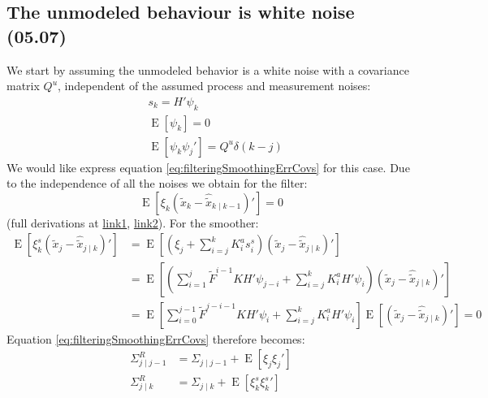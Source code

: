 \documentclass[oneside,12pt]{article}
\begin{document}
\subsection{The unmodeled behaviour is white noise (05.07)}\label{sec:subWhiteNoise}
%
We start by assuming the unmodeled behavior is a white noise with a covariance matrix $Q^u$, independent of the assumed process and measurement noises:
%
\begin{equation}
    \begin{split}
        &s_k = H' \psi_k\\
        &\operatorname{E}[\psi_k] = 0\\
        &\operatorname{E}[\psi_k \psi_j'] = Q^u \delta(k-j)
    \end{split}
\end{equation}
%
We would like express equation \ref{eq:filteringSmoothingErrCovs} for this case. Due to the independence of all the noises we obtain for the filter:
%
\begin{equation}
    \operatorname{E}[\xi_{k}(\tilde{x}_{k}- \hat{\tilde{x}}_{k \mid k-1})'] = 0
\end{equation}
%
(full derivations at \href{https://technionmail-my.sharepoint.com/:b:/g/personal/ron_teichner_campus_technion_ac_il/EfuePiH-kmhMl9R80PHRhnMButsVxmWqnO2MVCnZFKkLaA?e=IvXfRv}{link1}, \href{https://technionmail-my.sharepoint.com/:b:/g/personal/ron_teichner_campus_technion_ac_il/EWJu12JzYTtOq0LrN7YbSkMB4ctEU_lpwbnc20nSpUXWPA?e=ELjyGu}{link2}). For the smoother:
%
\begin{equation}
    \begin{split}
        \operatorname{E}[\xi^s_{k}(\tilde{x}_{j}- \hat{\tilde{x}}_{j \mid k})'] &= \operatorname{E}[(\xi_j + \sum_{i=j}^{k} K^a_{i} s^s_{i})(\tilde{x}_{j}- \hat{\tilde{x}}_{j \mid k})']\\
        &= \operatorname{E}[(\sum_{i=1}^{j} \tilde{F}^{i-1} K H' \psi_{j-i} + \sum_{i=j}^{k} K^a_{i} H'\psi_i)(\tilde{x}_{j}- \hat{\tilde{x}}_{j \mid k})']\\
        &= \operatorname{E}[\sum_{i=0}^{j-1} \tilde{F}^{j-i-1} K H' \psi_{i} + \sum_{i=j}^{k} K^a_{i} H'\psi_i] \operatorname{E}[(\tilde{x}_{j}- \hat{\tilde{x}}_{j \mid k})'] = 0
    \end{split}
\end{equation}
%
%
Equation \ref{eq:filteringSmoothingErrCovs} therefore becomes:
%
\begin{equation}\label{eq:whiteNoiseCovs}
    \begin{split}
        \Sigma^R_{j \mid j-1} &= \Sigma_{j \mid j-1} + \operatorname{E}[\xi_{j}\xi_{j}']\\
        \Sigma^R_{j \mid k} &= \Sigma_{j \mid k} + \operatorname{E}[\xi^s_{k}\xi^s_{k}']
    \end{split}
\end{equation}  
\end{document}

